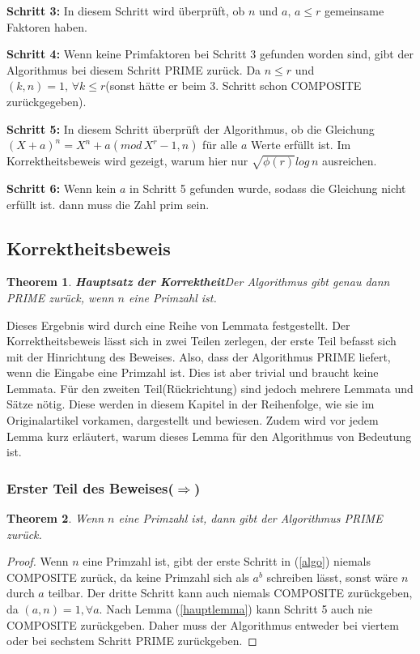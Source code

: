 \documentclass[12pt,oneside]{article}
\newtheorem{theorem}{Theorem}[section]
\theoremstyle{remark}
\theoremstyle{definition}
\begin{document}
\textbf{Schritt 3: }In diesem Schritt wird überprüft, ob $n$ und $a, \, a \leq r$ gemeinsame Faktoren haben. 

\textbf{Schritt 4: } Wenn keine Primfaktoren bei Schritt 3 gefunden worden sind, gibt der Algorithmus bei diesem Schritt PRIME zurück. Da $n \leq r$ und $(k,n) = 1, \, \forall k \leq r $(sonst hätte er beim 3. Schritt schon COMPOSITE zurückgegeben).

\textbf{Schritt 5: } In diesem Schritt überprüft der Algorithmus, ob die Gleichung $(X+a)^n = X^n + a (mod \, X^r - 1,n)$ für alle $a$ Werte erfüllt ist. Im Korrektheitsbeweis wird gezeigt, warum hier nur $\sqrt{\phi(r)} log \, n$ ausreichen.

\textbf{Schritt 6: } Wenn kein $a$ in Schritt 5 gefunden wurde, sodass die Gleichung nicht erfüllt ist. dann muss die Zahl prim sein. 
\newpage

\subsection{Korrektheitsbeweis}

\begin{theorem}
\textbf{Hauptsatz der Korrektheit}\newline Der Algorithmus gibt genau dann PRIME zurück, wenn $n$ eine Primzahl ist.
\end{theorem}
Dieses Ergebnis wird durch eine Reihe von Lemmata festgestellt. Der Korrektheitsbeweis lässt sich in zwei Teilen zerlegen, der erste Teil befasst sich mit der Hinrichtung des Beweises. Also, dass der Algorithmus PRIME liefert, wenn die Eingabe eine Primzahl ist. Dies ist aber trivial und braucht keine Lemmata. Für den zweiten Teil(Rückrichtung) sind jedoch mehrere Lemmata und Sätze nötig. Diese werden in diesem Kapitel in der Reihenfolge, wie sie im Originalartikel vorkamen, dargestellt und bewiesen. Zudem wird vor jedem Lemma kurz erläutert, warum dieses Lemma für den Algorithmus von Bedeutung ist.

\subsubsection{Erster Teil des Beweises($\Rightarrow$)}
\begin{theorem}\label{hin_rich}
Wenn $n$ eine Primzahl ist, dann gibt der Algorithmus PRIME zurück.
\end{theorem}

\begin{proof}
Wenn $n$ eine Primzahl ist, gibt der erste Schritt in (\ref{algo}) niemals COMPOSITE zurück, da keine Primzahl sich als $a^b$ schreiben lässt, sonst wäre $n$ durch $a$ teilbar. Der dritte Schritt kann auch niemals COMPOSITE zurückgeben, da $(a,n) = 1, \forall a$. Nach Lemma (\ref{hauptlemma}) kann Schritt 5 auch nie COMPOSITE zurückgeben. Daher muss der Algorithmus entweder bei viertem oder bei sechstem Schritt PRIME zurückgeben.  
\end{proof}
\end{document}

